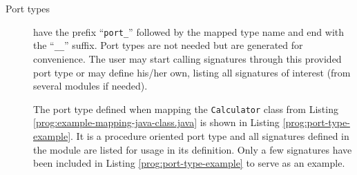 \begin{description}
\item[Port types] have the prefix ``\verb+port_+'' followed by
the mapped type name and end with the ``\verb+__+'' suffix.
Port types are not needed but are generated for convenience.
The user may start calling signatures through this provided port type
or may define his/her own, listing all signatures of interest
(from several modules if needed).

The port type defined when mapping the \verb=Calculator= class
from Listing \ref{prog:example-mapping-java-class.java}
is shown in Listing \ref{prog:port-type-example}.
It is a procedure oriented port type and all signatures defined in the module
are listed for usage in its definition.
Only a few signatures have been included
in Listing \ref{prog:port-type-example} to serve as an example.

\begin{program}
\caption{The generated port type for the \texttt{Calculator} class%
	\label{prog:port-type-example}}
\end{program}

\end{description}


